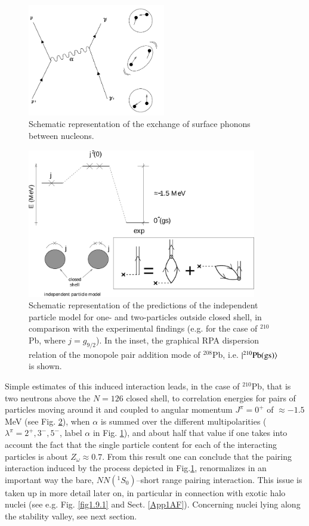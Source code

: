 \begin{figure}
\centerline {
\includegraphics*[width=6cm]{introduccion/figs/figintroD9}
}
\caption{Schematic representation of the exchange of surface phonons between nucleons.}
\label{fig:4.9}
\end{figure}
\begin{figure}
\centerline {
\includegraphics*[width=10cm]{introduccion/figs/figintroD10}
}
\caption{Schematic representation of the predictions of the independent particle model for one- and two-particles outside closed shell, in comparison with the experimental findings (e.g. for the case of $^{210}$Pb, where $j=g_{9/2}$). In the inset, the graphical RPA dispersion relation of the monopole pair addition mode of $^{208}$Pb, i.e. $|{^{210}\text{Pb(gs)}} \rangle$ is shown.}
\label{fig:4.10}
\end{figure}
Simple estimates of this induced interaction leads, in the case of $^{210}$Pb, that is two neutrons above the $N=126$ closed shell, to correlation energies  for pairs of particles moving around it and coupled to angular momentum $J^{\pi} = 0^+$ of $\approx -1.5$ MeV (see Fig. \ref{fig:4.10}), when $\alpha$ is summed over  the different multipolarities  ($\lambda^{\pi}=2^+,3^-,5^-$, label $\alpha$ in Fig. \ref{fig:4.9}), and about half that value if one takes into account the fact that the single particle content  for each of the interacting particles is about $Z_\omega\approx0.7$. From this result one can conclude that the pairing interaction induced by the process depicted in Fig.\ref{fig:4.9}, renormalizes in an important way the bare, $NN(^1S_0)$--short range pairing interaction. This issue is taken up in more detail later on, in particular in connection with exotic halo nuclei (see e.g. Fig. \ref{fig1.9.1} and Sect. \ref{App1AF}). Concerning nuclei lying along the stability valley, see next section.

